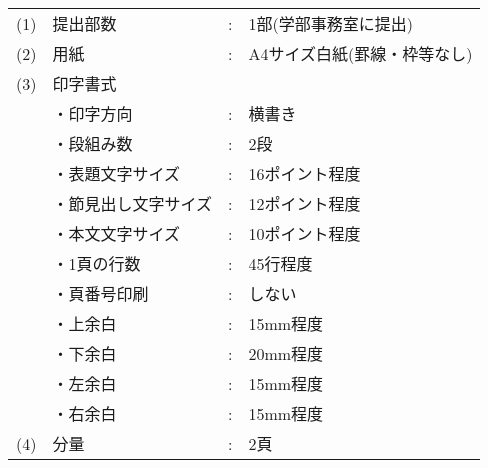 \begin{tabular}{llcl}
  (1) & 提出部数                          & : & 1部(学部事務室に提出)                                    \\
  (2) & 用紙                              & : & A4サイズ白紙(罫線・枠等なし)                             \\
  (3) & 印字書式                          &   &                                                          \\
      & \hspace*{1zw}・印字方向           & : & 横書き                                                   \\
      & \hspace*{1zw}・段組み数           & : & 2段                                                      \\
      & \hspace*{1zw}・表題文字サイズ     & : & 16ポイント程度                                           \\
      & \hspace*{1zw}・節見出し文字サイズ & : & 12ポイント程度                                           \\
      & \hspace*{1zw}・本文文字サイズ     & : & 10ポイント程度                                           \\
      & \hspace*{1zw}・1頁の行数          & : & 45行程度                                                 \\
      & \hspace*{1zw}・頁番号印刷         & : & しない                                                   \\
      & \hspace*{1zw}・上余白             & : & 15mm程度                                                 \\
      & \hspace*{1zw}・下余白             & : & 20mm程度                                                 \\
      & \hspace*{1zw}・左余白             & : & 15mm程度                                                 \\
      & \hspace*{1zw}・右余白             & : & 15mm程度                                                 \\
  (4) & 分量                              & : & 2頁                                                      \\

\end{tabular}
